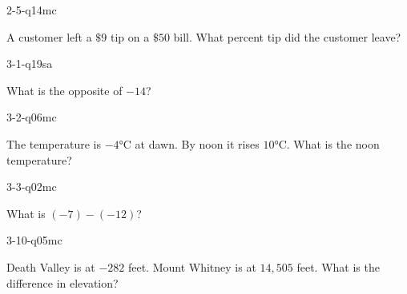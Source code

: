 \begin{practiceQuestion}{2-5-q14}{mc}
\begin{questionText}
A customer left a $\$9$ tip on a $\$50$ bill. What percent tip did the customer leave?


\end{questionText}
\end{practiceQuestion}

\begin{practiceQuestion}{3-1-q19}{sa}
\begin{questionText}
What is the opposite of $-14$?
\end{questionText}
\end{practiceQuestion}

\begin{practiceQuestion}{3-2-q06}{mc}
\begin{questionText}
The temperature is $-4°$C at dawn. By noon it rises $10°$C. What is the noon temperature?
\end{questionText}
\end{practiceQuestion}

\begin{practiceQuestion}{3-3-q02}{mc}
\begin{questionText}
What is $(-7) - (-12)$?
\end{questionText}
\end{practiceQuestion}

\begin{practiceQuestion}{3-10-q05}{mc}
\begin{questionText}
Death Valley is at $-282$ feet. Mount Whitney is at $14{,}505$ feet. What is the difference in elevation?
\end{questionText}
\end{practiceQuestion}

